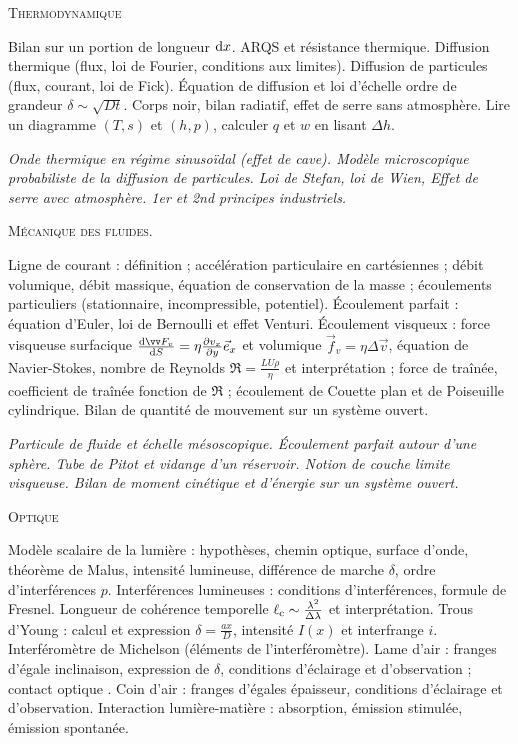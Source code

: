 \documentclass[12pt,fancy]{cours}
\begin{document}
\begin{enumerate}
\medskip
\item \textsc{Thermodynamique}
\item[\Note] Bilan sur un portion de longueur $\mathrm{d} x$. ARQS et résistance thermique. Diffusion thermique (flux, loi de Fourier, conditions aux limites). Diffusion de particules (flux, courant, loi de Fick). Équation de diffusion et loi d'échelle ordre de grandeur $\delta \sim \sqrt{Dt}$. Corps noir, bilan radiatif, effet de serre sans atmosphère. Lire un diagramme $(T,s)$ et $(h,p)$, calculer $q$ et $w$ en lisant $\Delta h$.
{\small
\item[\Nnote] \emph{Onde thermique en régime sinusoïdal (effet de cave). Modèle microscopique probabiliste de la diffusion de particules. Loi de Stefan, loi de Wien, Effet de serre avec atmosphère. 1er et 2nd principes industriels.}
}
\medskip
\item \textsc{Mécanique des fluides}.
\item[\Note] Ligne de courant : définition ; accélération particulaire en cartésiennes ; débit volumique, débit massique, équation de conservation de la masse ; écoulements particuliers (stationnaire, incompressible, potentiel). Écoulement parfait : équation d'Euler, loi de Bernoulli et effet Venturi. Écoulement visqueux : force visqueuse surfacique $\frac{\d \Vec{F}_v}{\d S}=\eta\frac{\partial v_x}{\partial y}\vec{e}_x$ et volumique $\Vec{f}_{\!v}=\eta\Delta\vec{v}$,
équation de Navier-Stokes, nombre de Reynolds $\Re = \frac{LU\rho}{\eta}$ et interprétation ; force de traînée, coefficient de traînée fonction de $\Re$ ; écoulement de Couette plan et de Poiseuille cylindrique. Bilan de quantité de mouvement sur un système ouvert.
{\small
\item[\Nnote] \emph{Particule de fluide et échelle mésoscopique. Écoulement parfait autour d'une sphère. Tube de Pitot et vidange d'un réservoir. Notion de couche limite visqueuse. Bilan de moment cinétique et d'énergie sur un système ouvert.}
}
\medskip
\item \textsc{Optique}
\item[\Note] Modèle scalaire de la lumière : hypothèses, chemin optique, surface d'onde, théorème de Malus, intensité lumineuse, différence de marche $\delta$, ordre d'interférences $p$. Interférences lumineuses : conditions d'interférences, formule de Fresnel. Longueur de cohérence temporelle  $\ell_{\rm{c}}\sim\frac{\lambda^2}{\Delta\lambda}$ et interprétation. Trous d'Young : calcul et expression $\delta = \frac{a x}{D}$, intensité $I(x)$ et interfrange $i$. Interféromètre de Michelson (éléments de l'interféromètre). Lame d'air : franges d'égale inclinaison, expression de $\delta$, conditions d'éclairage et d'observation ; contact optique . Coin d'air : franges d'égales épaisseur, conditions d'éclairage et d'observation. Interaction lumière-matière : absorption, émission stimulée, émission spontanée. 

\end{enumerate}
\end{document}
